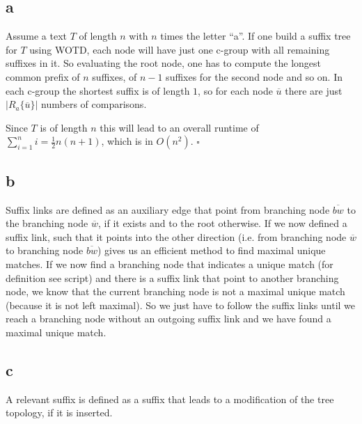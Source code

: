 \documentclass[%
   10pt,              %
   ngerman,           %
   a4paper,           %
   DIV11,             %
]{scrartcl}%
\begin{document}
\subsection*{a}
Assume a text $T$ of length $n$ with $n$ times the letter ``a''. If one build a suffix tree for $T$ 
using WOTD, each node will have just one c-group with all remaining suffixes in it. So evaluating the 
root node, one has to compute the longest common prefix of $n$ suffixes, of $n-1$ suffixes for the 
second node and so on. In each c-group the shortest suffix is of length $1$, so for each node $\overline{u}$ 
there are just $|R_a\{\overline{u}\}|$ numbers of comparisons.

Since $T$ is of length $n$ this will lead to an overall runtime of $\sum_{i=1}^{n}i = \frac{1}{2}n(n+1)$, 
which is in $O(n^2)$. $\square$


\subsection*{b}
Suffix links are defined as an auxiliary edge that point from branching node $\overline{bw}$ to the branching 
node $\overline{w}$, if it exists and to the root otherwise. If we now defined a suffix link, such that it 
points into the other direction (i.e. from branching node $\overline{w}$ to branching node $\overline{bw}$) gives 
us an efficient method to find maximal unique matches. If we now find a branching node that indicates 
a unique match (for definition see script) and there is a suffix link that point to another branching node, we know that the current 
branching node is not a maximal unique match (because it is not left maximal). So we just have to 
follow the suffix links until we reach a branching node without an outgoing suffix link and we have 
found a maximal unique match.


\subsection*{c}
A relevant suffix is defined as a suffix that leads to a modification of the tree topology, if it is 
inserted. 
\end{document}
